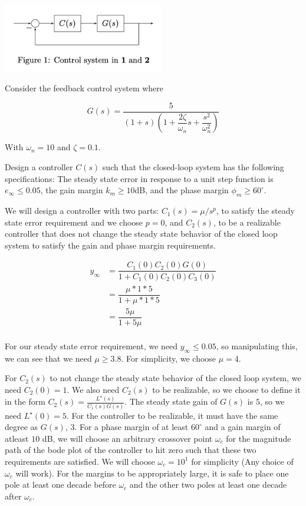 \documentclass[11pt]{article}
\begin{document}
\includegraphics[width=200pt]{a4_1.png}

Consider the feedback control system where

\[ G(s) = \dfrac{5}{(1 + s) \left(1 + \dfrac{2 \zeta}{\omega_n} s + \dfrac{s^2}{\omega_n^2} \right)} \]

With $\omega_n = 10$ and $\zeta = 0.1$.

Design a controller $C(s)$ such that the closed-loop system has the following specifications: The steady state error in response to a unit step function is $e_\infty \leq 0.05$, the gain margin $k_m \geq 10$dB, and the phase margin $\phi_m \geq 60^\circ$.

We will design a controller with two parts: $C_1(s) = \mu / s^p$, to satisfy the steady state error requirement and we choose $p = 0$, and $C_2(s)$, to be a realizable controller that does not change the steady state behavior of the closed loop system to satisfy the gain and phase margin requirements.

\begin{align*}  
  y_\infty &= \dfrac{C_1(0)C_2(0)G(0)}{1 + C_1(0) C_2(0) C_3(0)} \\
  &= \dfrac{\mu * 1 * 5}{1 + \mu * 1 * 5} \\
  &= \dfrac{5 \mu}{1 + 5 \mu} \\
\end{align*}

For our steady state error requirement, we need $y_\infty \leq 0.05$, so manipulating this, we can see that we need $\mu \geq 3.8$. For simplicity, we choose $\mu = 4$.

For $C_2(s)$ to not change the steady state behavior of the closed loop system, we need $C_2(0) = 1$. We also need $C_2(s)$ to be realizable, so we choose to define it in the form $C_2(s) = \frac{L^\star(s)}{C_1(s) G(s)}$. The steady state gain of $G(s)$ is $5$, so we need $L^\star(0) = 5$. For the controller to be realizable, it must have the same degree as $G(s)$, 3. For a phase margin of at least $60^\circ$ and a gain margin of atleast $10$ dB, we will choose an arbitrary crossover point $\omega_c$ for the magnitude path of the bode plot of the controller to hit zero such that these two requirements are satisfied. We will choose $\omega_c = 10^1$ for simplicity (Any choice of $\omega_c$ will work). For the margins to be appropriately large, it is safe to place one pole at least one decade before $\omega_c$ and the other two poles at least one decade after $\omega_c$. 
\end{document}
